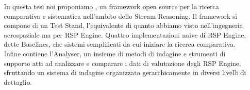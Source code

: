 In questa tesi noi proponiamo \namens, un framework open source per la ricerca comparativa e sistematica nell'ambito dello Stream Reasoning. Il framework si compone di un Test Stand, l'equivalente di quanto abbiamo visto nell'ingegneria aerospaziale ma per RSP Engine. Quattro implementazioni naive di RSP Engine, dette Baselines, che sistemi semplificati da cui iniziare la ricerca comparativa. Infine \name contiene l'Analyser, un insieme di metodi di indagine e strumenti di supporto atti ad analizzare e comparare i dati di valutazione degli RSP Engine, sfruttando un sistema di indagine organizzato gerarchicamente in diversi livelli di dettaglio.
